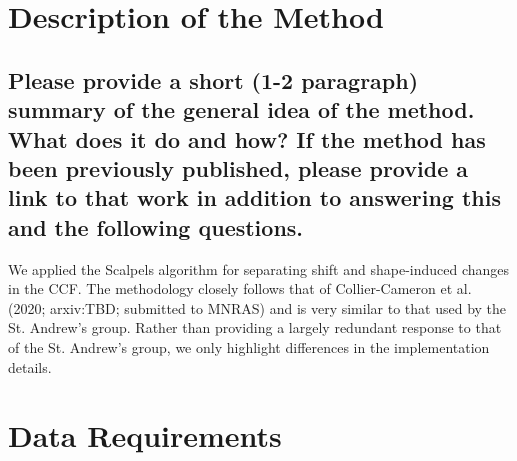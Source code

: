 \documentclass[12pt]{article}
\begin{document}
\section{Description of the Method}
\subsection{Please provide a short (1-2 paragraph) summary of the general idea of the method.  What does it do and how?  If the method has been previously published, please provide a link to that work in addition to answering this and the following questions.}

We applied the Scalpels algorithm for separating shift and shape-induced changes in the CCF.
The methodology closely follows that of Collier-Cameron et al. (2020; arxiv:TBD; submitted to MNRAS) and is very similar to that used by the St. Andrew's group.
Rather than providing a largely redundant response to that of the St. Andrew's group, we only highlight differences in the implementation details.







\section{Data Requirements}
\end{document}
